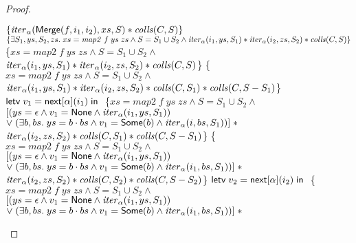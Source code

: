 \begin{proof}
\begin{itemize}
\begin{specification}
\nextline $\{{\mathit{iter}_\alpha(\mathsf{Merge}(f, i_1, i_2), xs, S) * \mathit{colls}(C,S)}\}$ 
\nextline $\{{\exists S_1, ys, S_2, zs.\; 
                    xs = \mathit{map2}\;f\;ys\;zs \land 
                    S = S_1 \cup S_2 \land
                    \mathit{iter}_\alpha(i_1, ys, S_1) * 
                    \mathit{iter}_\alpha(i_2, zs, S_2) * 
                    \mathit{colls}(C, S)}\}$ 
\nextline \{$xs = \mathit{map2}\;f\;ys\;zs \land 
                  S = S_1 \cup S_2 \land$ 
\\ \>\;     $\mathit{iter}_\alpha(i_1, ys, S_1) * 
                  \mathit{iter}_\alpha(i_2, zs, S_2) * 
                  \mathit{colls}(C,S)$\}
\nextline \{$xs = \mathit{map2}\;f\;ys\;zs \land 
                  S = S_1 \cup S_2 \land$ 
\\ \>\;     $\mathit{iter}_\alpha(i_1, ys, S_1) * 
                  \mathit{iter}_\alpha(i_2, zs, S_2) * 
                  \mathit{colls}(C,S_1) * \mathit{colls}(C, S - S_1)$\}
\nextline $\mathsf{letv}\;v_1 = \mathsf{next}[\alpha](i_1)\;\mathsf{in}\;$
\nextline \{$xs = \mathit{map2}\;f\;ys\;zs \land 
                  S = S_1 \cup S_2 \land$ 
\\ \>\;     $[(ys = \epsilon \land v_1 = \mathsf{None} \land \mathit{iter}_\alpha(i_1, ys, S_1))$ 
\\ \>\;\;    $\vee\; (\exists b, bs.\; ys = b\cdot bs \land v_1 = \mathsf{Some}(b) \land 
                                \mathit{iter}_\alpha(i, bs, S_1))] \;*$ 
\\ \>\;     $\mathit{iter}_\alpha(i_2, zs, S_2) * 
             \mathit{colls}(C,S_1) * \mathit{colls}(C, S - S_1)$\}
\nextline \{$xs = \mathit{map2}\;f\;ys\;zs \land 
                  S = S_1 \cup S_2 \land$ 
\\ \>\;     $[(ys = \epsilon \land v_1 = \mathsf{None} \land \mathit{iter}_\alpha(i_1, ys, S_1))$ 
\\ \>\;\;    $\vee\; (\exists b, bs.\; ys = b\cdot bs \land v_1 = \mathsf{Some}(b) \land 
                                \mathit{iter}_\alpha(i_1, bs, S_1))] \;*$ 
\\ \>\;     $\mathit{iter}_\alpha(i_2, zs, S_2) * 
             \mathit{colls}(C,S_2) * \mathit{colls}(C, S - S_2)$\}
\nextline $\mathsf{letv}\;v_2 = \mathsf{next}[\alpha](i_2)\;\mathsf{in}\;$ 
\nextline \{$xs = \mathit{map2}\;f\;ys\;zs \land 
                  S = S_1 \cup S_2 \land$ 
\\ \>\;     $[(ys = \epsilon \land v_1 = \mathsf{None} \land \mathit{iter}_\alpha(i_1, ys, S_1))$ 
\\ \>\;\;    $\vee\; (\exists b, bs.\; ys = b\cdot bs \land v_1 = \mathsf{Some}(b) \land 
                                \mathit{iter}_\alpha(i_1, bs, S_1))] \;*$ 

\end{specification}
\end{itemize}
\end{proof}
